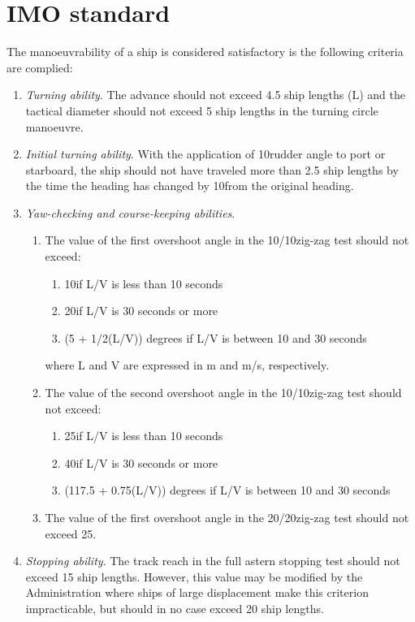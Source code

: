 \section{IMO standard}
The manoeuvrability of a ship is considered satisfactory is the following criteria are complied:
\begin{enumerate}
	\item \emph{Turning ability}. The advance should not exceed 4.5 ship lengths (L) and the tactical diameter should not exceed 5 ship lengths in the turning circle manoeuvre.
	\item \emph{Initial turning ability}. With the application of 10\degree rudder angle to port or starboard, the ship should not have traveled more than 2.5 ship lengths by the time the heading has changed by 10\degree from the original heading. 
	\item \emph{Yaw-checking and course-keeping abilities}. 
	\begin{enumerate}
		\item The value of the first overshoot angle in the 10\degree/10\degree zig-zag test should not exceed: 
		\begin{enumerate}
			\item 10\degree if L/V is less than 10 seconds
			\item 20\degree if L/V is 30 seconds or more
			\item (5 + 1/2(L/V)) degrees if L/V is between 10 and 30 seconds
		\end{enumerate}
		where L and V are expressed in m and m/s, respectively.
		\item The value of the second overshoot angle in the 10\degree/10\degree zig-zag test should not exceed:
		\begin{enumerate}
			\item 25\degree if L/V is less than 10 seconds
			\item 40\degree if L/V is 30 seconds or more
			\item (117.5 + 0.75(L/V)) degrees if L/V is between 10 and 30 seconds
		\end{enumerate}
		\item The value of the first overshoot angle in the 20\degree/20\degree zig-zag test should not exceed 25\degree. 
	\end{enumerate}
	\item \emph{Stopping ability}. The track reach in the full astern stopping test should not exceed 15 ship lengths. However, this value may be modified by the Administration where ships of large displacement make this criterion impracticable, but should in no case exceed	20 ship lengths. 
\end{enumerate}

